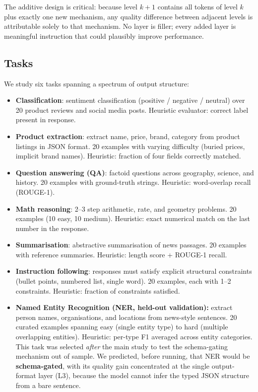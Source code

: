 The additive design is critical: because level $k+1$ contains all tokens of
level $k$ plus exactly one new mechanism, any quality difference between
adjacent levels is attributable solely to that mechanism.
No layer is filler; every added layer is meaningful instruction that could
plausibly improve performance.

\subsection{Tasks}
\label{sec:tasks}

We study six tasks spanning a spectrum of output structure:

\begin{itemize}
  \item \textbf{Classification}: sentiment classification (positive / negative
    / neutral) over 20 product reviews and social media posts.
    Heuristic evaluator: correct label present in response.
  \item \textbf{Product extraction}: extract name, price, brand, category
    from product listings in JSON format.
    20 examples with varying difficulty (buried prices, implicit brand names).
    Heuristic: fraction of four fields correctly matched.
  \item \textbf{Question answering (QA)}: factoid questions across geography,
    science, and history. 20 examples with ground-truth strings.
    Heuristic: word-overlap recall (ROUGE-1).
  \item \textbf{Math reasoning}: 2--3 step arithmetic, rate, and geometry
    problems. 20 examples (10 easy, 10 medium).
    Heuristic: exact numerical match on the last number in the response.
  \item \textbf{Summarisation}: abstractive summarisation of news passages.
    20 examples with reference summaries.
    Heuristic: length score + ROUGE-1 recall.
  \item \textbf{Instruction following}: responses must satisfy explicit
    structural constraints (bullet points, numbered list, single word).
    20 examples, each with 1--2 constraints.
    Heuristic: fraction of constraints satisfied.
  \item \textbf{Named Entity Recognition (NER, held-out validation):}
    extract person names, organisations, and locations from news-style
    sentences. 20 curated examples spanning easy (single entity type) to
    hard (multiple overlapping entities). Heuristic: per-type F1 averaged
    across entity categories.
    This task was selected \emph{after} the main study to test the
    schema-gating mechanism out of sample. We predicted, before running, that
    NER would be \textbf{schema-gated}, with its quality gain concentrated at
    the single output-format layer (L3), because the model cannot infer the
    typed JSON structure from a bare sentence.
\end{itemize}


